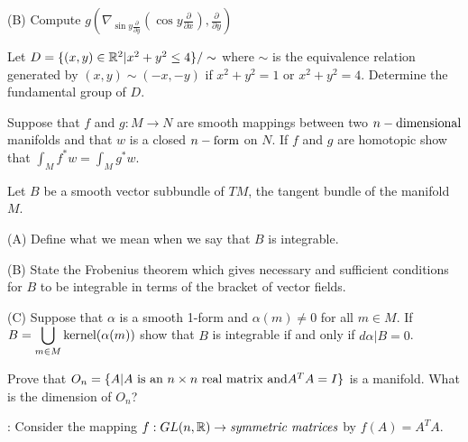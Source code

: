 \documentclass[bbb]{report}
\def\ds{\displaystyle}
\def\R{{\Bbb R}}
\begin{document}
\begin{Large}
\begin{description}
\vspace{.1in}
\item[\quad] (B)
Compute $g \left( \nabla_{\sin y\frac{\partial}{\partial y}}
  \left( \cos y\frac{\partial}{\partial x} \right),
  \frac{\partial}{\partial y} \right)$


\vspace{.5in}

\item[4.]
Let $D=\{(x,y)\in\R^2\vert x^2+y^2\leq 4\}/\sim$
where $\sim$ is the equivalence relation generated by
$(x,y)\sim(-x,-y)$ if $x^2+y^2=1$ or $x^2+y^2=4$.
Determine the fundamental group of $D$.

\vspace{.5in}
\item[5.]
Suppose that $f$ and $g:M\to N$ are smooth mappings
between two $n-\hbox{dimensional}$ manifolds and that $w$ is a
closed $n-\hbox{form}$ on $N$.
If $f$ and $g$ are homotopic show that
$\ds\int_Mf^\ast w=\ds\int_Mg^\ast w$.

\vspace{.5in}
\item[6.]
Let $B$ be a smooth vector subbundle of $TM$, the tangent bundle
of the manifold $M$.

\vspace{.1in}
\item{\quad} (A)
Define what we mean when we say that $B$ is integrable.

\vspace{.1in}
\item[\quad] (B)
State the Frobenius theorem which gives necessary and sufficient
conditions for $B$ to be integrable in terms of the bracket of
vector fields.

\vspace{.1in}
\item[\quad] (C)
Suppose that $\alpha$ is a smooth 1-form and $\alpha(m)\not= 0$
for all $m\in M$. If $B=\ds\bigcup_{m\in M} \hbox{kernel}(\alpha(m))$
show that $B$ is integrable if and only if $d\alpha\vert B=0$.


\vspace{.5in}
\item[7.]
Prove that $O_n=\{A\vert A \ \hbox{is an $n\times n$ real matrix and}
A^TA=I\}$ is a manifold. What is the dimension of $O_n$?

\item[\quad] : Consider the mapping
$f:GL(n,\R)\to\hbox{\it symmetric matrices}$ by $f(A)=A^TA$.


\end{description}
\end{Large}
\end{document}
